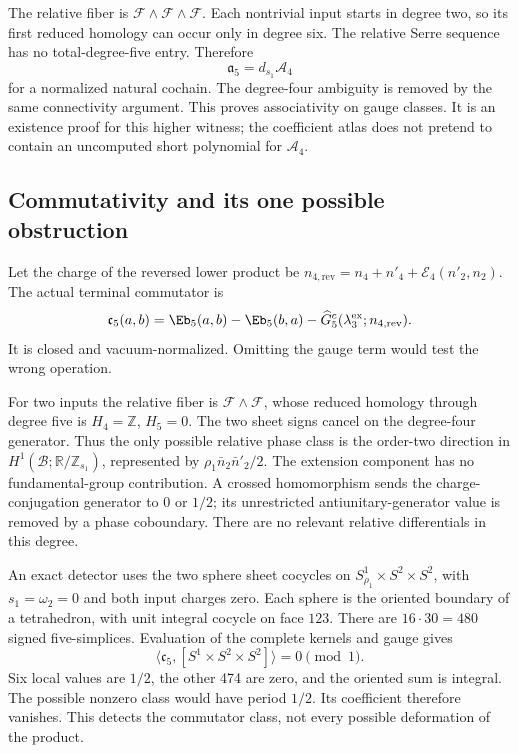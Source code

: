 The relative fiber is $\mathscr F\wedge\mathscr F\wedge\mathscr F$. Each nontrivial input starts in degree two, so its first reduced homology can occur only in degree six. The relative Serre sequence has no total-degree-five entry. Therefore
\begin{equation}\label{eq:assocvanish}
 \mathfrak a_5=d_{s_1}\mathcal A_4
\end{equation}
for a normalized natural cochain. The degree-four ambiguity is removed by the same connectivity argument. This proves associativity on gauge classes. It is an existence proof for this higher witness; the coefficient atlas does not pretend to contain an uncomputed short polynomial for $\mathcal A_4$.

\subsection{Commutativity and its one possible obstruction}\label{subsec:comm4}
Let the charge of the reversed lower product be
$n_{4,\mathrm{rev}}=n_4+n'_4+\mathcal E_4(n'_2,n_2)$.
The actual terminal commutator is
\begin{equation}\label{eq:commdef4}
 \mathfrak c_5(a,b)
 =\Eb_5(a,b)-\Eb_5(b,a)
   -\widehat G^c_5(\lambda_3^{\mathrm{ex}};n_{4,\mathrm{rev}}).
\end{equation}
It is closed and vacuum-normalized. Omitting the gauge term would test the wrong operation.

For two inputs the relative fiber is $\mathscr F\wedge\mathscr F$, whose reduced homology through degree five is $H_4=\mathbb Z$, $H_5=0$. The two sheet signs cancel on the degree-four generator. Thus the only possible relative phase class is the order-two direction in
$H^1(\mathscr B;\mathbb R/\mathbb Z_{s_1})$, represented by
$\rho_1\bar n_2\bar n'_2/2$.
The extension component has no fundamental-group contribution. A crossed homomorphism sends the charge-conjugation generator to $0$ or $1/2$; its unrestricted antiunitary-generator value is removed by a phase coboundary. There are no relevant relative differentials in this degree.

An exact detector uses the two sphere sheet cocycles on
$S^1_{\rho_1}\times S^2\times S^2$, with $s_1=\omega_2=0$ and both input charges zero. Each sphere is the oriented boundary of a tetrahedron, with unit integral cocycle on face $123$. There are $16\cdot30=480$ signed five-simplices. Evaluation of the complete kernels and gauge gives
\begin{equation}\label{eq:commperiod}
 \langle\mathfrak c_5,[S^1\times S^2\times S^2]\rangle=0\pmod1.
\end{equation}
Six local values are $1/2$, the other 474 are zero, and the oriented sum is integral. The possible nonzero class would have period $1/2$. Its coefficient therefore vanishes. This detects the commutator class, not every possible deformation of the product.

